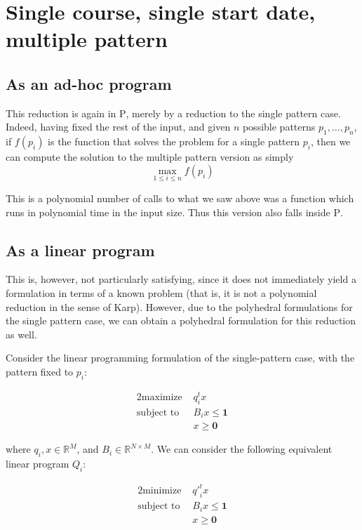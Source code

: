 \section{Single course, single start date, multiple pattern}

\subsection{As an ad-hoc program}
This reduction is again in \textsc{P}, merely by a reduction to the single pattern case. Indeed, having fixed the rest of the input, and given $n$ possible patterns $p_1, \dots, p_n$, if $f(p_i)$ is the function that solves the problem for a single pattern $p_i$, then we can compute the solution to the multiple pattern version as simply
$$
\max_{1 \le i \le n} f(p_i)
$$

This is a polynomial number of calls to what we saw above was a function which runs in polynomial time in the input size. Thus this version also falls inside \textsc{P}.

\subsection{As a linear program}
This is, however, not particularly satisfying, since it does not immediately yield a formulation in terms of a known problem (that is, it is not a polynomial reduction in the sense of Karp). However, due to the polyhedral formulations for the single pattern case, we can obtain a polyhedral formulation for this reduction as well.

Consider the linear programming formulation of the single-pattern case, with the pattern fixed to $p_i$:

\begin{alignat*}{2}
  \text{maximize } & q_i^t x \\
  \text{subject to } & B_i x \le \mathbf{1}\\
                     & x \ge \mathbf{0}
\end{alignat*}

where $q_i, x \in \mathbb{R}^M$, and $B_i \in \mathbb{R}^{N \times M}$. We can consider the following equivalent linear program $Q_i$:

\begin{alignat*}{2}
  \text{minimize } & {q'}_i^t x \\
  \text{subject to } & B_i x \le \mathbf{1}\\
                     & x \ge \mathbf{0}
\end{alignat*}

